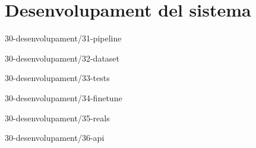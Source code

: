 \chapter{Desenvolupament del sistema}

{30-desenvolupament/31-pipeline}

{30-desenvolupament/32-dataset}

{30-desenvolupament/33-tests}

{30-desenvolupament/34-finetune}

{30-desenvolupament/35-reals}

{30-desenvolupament/36-api}




\begin{comment}
3 Desenvolupament del sistema
    3.1 Arquitectura teòrica del sistema (pipeline)
    3.2 Creació dataset teòric
    [?] 3.3 Creació de tests
    3.4 Finetune teòric
    3.5 Dataset i finetune amb dades reals
        3.5.1 Estadístiques descriptives
        3.5.2 Tendències i patrons
        3.5.3 Problemes i incidències comunes
        3.5.4 Anomalies i valors atípics
    3.6 Desplegament API
\end{comment}

